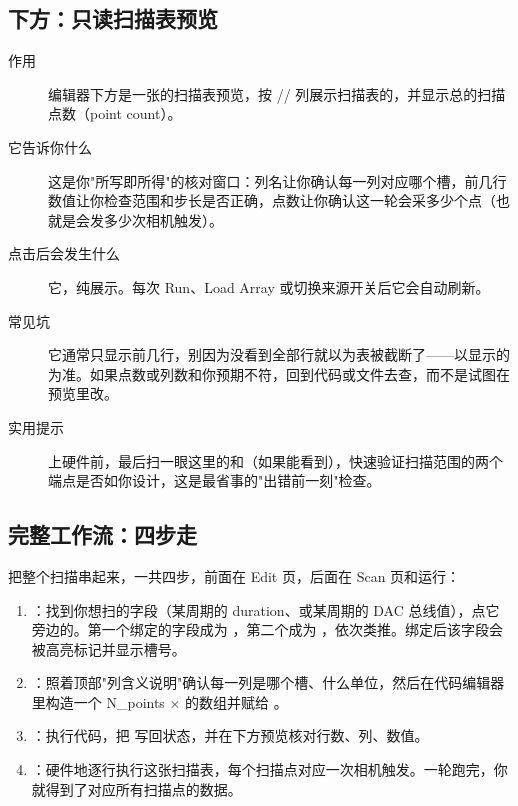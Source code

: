 \documentclass[11pt,oneside,openany]{book}
\begin{document}
\subsection{下方：只读扫描表预览}

\begin{description}
\item[作用] 编辑器下方是一张的扫描表预览，按 // 列展示扫描表的，并显示总的扫描点数（point count）。
\item[它告诉你什么] 这是你"所写即所得"的核对窗口：列名让你确认每一列对应哪个槽，前几行数值让你检查范围和步长是否正确，点数让你确认这一轮会采多少个点（也就是会发多少次相机触发）。
\item[点击后会发生什么] 它，纯展示。每次 Run、Load Array 或切换来源开关后它会自动刷新。
\item[常见坑] 它通常只显示前几行，别因为没看到全部行就以为表被截断了——以显示的为准。如果点数或列数和你预期不符，回到代码或文件去查，而不是试图在预览里改。
\item[实用提示] 上硬件前，最后扫一眼这里的和（如果能看到），快速验证扫描范围的两个端点是否如你设计，这是最省事的"出错前一刻"检查。
\end{description}

\subsection{完整工作流：四步走}

把整个扫描串起来，一共四步，前面在 Edit 页，后面在 Scan 页和运行：

\begin{enumerate}
\item {}：找到你想扫的字段（某周期的 duration、或某周期的 DAC 总线值），点它旁边的。第一个绑定的字段成为 ，第二个成为 ，依次类推。绑定后该字段会被高亮标记并显示槽号。
\item {}：照着顶部"列含义说明"确认每一列是哪个槽、什么单位，然后在代码编辑器里构造一个 N\_points ×  的数组并赋给 。
\item {}：执行代码，把  写回状态，并在下方预览核对行数、列、数值。
\item {}：硬件地逐行执行这张扫描表，每个扫描点对应一次相机触发。一轮跑完，你就得到了对应所有扫描点的数据。
\end{enumerate}
\end{document}
